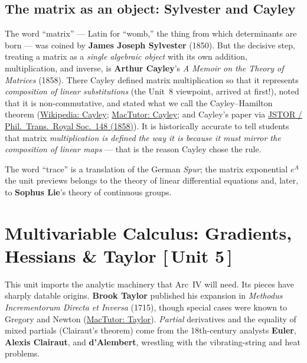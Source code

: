 \documentclass[11pt]{article}
\newcommand{\who}[1]{{\sffamily\bfseries #1}}
\newcommand{\yr}[1]{{\sffamily\color{BrickRed}(#1)}}
\newcommand{\unit}[1]{{\footnotesize\sffamily\color{RoyalBlue}[\,#1\,]}}
\begin{document}
\subsection{The matrix as an object: Sylvester and Cayley}
The word ``matrix'' --- Latin for ``womb,'' the thing from which determinants are
born --- was coined by \who{James Joseph Sylvester} \yr{1850}. But the decisive
step, treating a matrix as a \emph{single algebraic object} with its own addition,
multiplication, and inverse, is \who{Arthur Cayley}'s \emph{A Memoir on the Theory
of Matrices} \yr{1858}. There Cayley defined matrix multiplication so that it
represents \emph{composition of linear substitutions} (the Unit~8 viewpoint,
arrived at first!), noted that it is non-commutative, and stated what we call the
Cayley--Hamilton theorem
(\href{https://en.wikipedia.org/wiki/Arthur_Cayley}{Wikipedia: Cayley};
\href{https://mathshistory.st-andrews.ac.uk/Biographies/Cayley/}{MacTutor:
Cayley}; and Cayley's paper via
\href{https://www.jstor.org/stable/108649}{JSTOR / Phil.\ Trans.\ Royal Soc.\ 148
(1858)}). It is historically accurate to tell students that matrix
\emph{multiplication is defined the way it is because it must mirror the
composition of linear maps} --- that is the reason Cayley chose the rule.

The word ``trace'' is a translation of the German \emph{Spur}; the matrix
exponential $e^A$ the unit previews belongs to the theory of linear differential
equations and, later, to \who{Sophus Lie}'s theory of continuous groups.

\section{Multivariable Calculus: Gradients, Hessians \& Taylor \unit{Unit 5}}

This unit imports the analytic machinery that Arc~IV will need. Its pieces have
sharply datable origins. \who{Brook Taylor} published his expansion in
\emph{Methodus Incrementorum Directa et Inversa} \yr{1715}, though special cases
were known to Gregory and Newton
(\href{https://mathshistory.st-andrews.ac.uk/Biographies/Taylor/}{MacTutor:
Taylor}). \emph{Partial} derivatives and the equality of mixed partials
(Clairaut's theorem) come from the 18th-century analysts \who{Euler},
\who{Alexis Clairaut}, and \who{d'Alembert}, wrestling with the vibrating-string
and heat problems.
\end{document}
